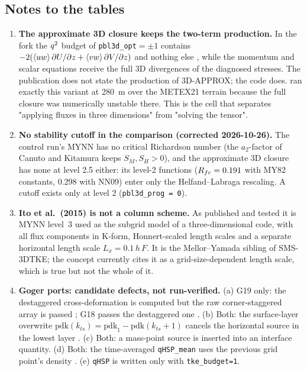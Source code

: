 \subsection*{Notes to the tables}
\begin{small}
\begin{enumerate}[leftmargin=*,itemsep=2pt]
\item \textbf{The approximate 3D closure keeps the two-term production.} In the fork the $q^{2}$
budget of \texttt{pbl3d\_opt}$=\pm1$ contains $-2(\langle uw \rangle\,\partial U/\partial z + \langle vw \rangle\,\partial V/\partial z)$ and
nothing else , while the momentum and scalar equations receive the full 3D
divergences of the diagnosed stresses. The publication does not state the production of 3D-APPROX;
the code does. \textcite{wiersema2023} ran exactly this variant at 280~m over the METEX21 terrain because the full closure was numerically unstable there. This is the cell that separates "applying fluxes in three dimensions" from "solving
the tensor".
\item \textbf{No stability cutoff in the comparison (corrected 2026-10-26).} The control run's MYNN has no critical
Richardson number (the $a_2$-factor of Canuto and Kitamura keeps $S_M, S_H > 0$), and the approximate
3D closure has none at level 2.5 either: its level-2 functions ($R_{fc} = 0.191$ with MY82 constants, 0.298 with
NN09) enter only the Helfand--Labraga rescaling. A cutoff exists only at level 2 (\texttt{pbl3d\_prog = 0}).
\item \textbf{Ito et al.\ (2015) is not a column scheme.} As published and tested it is MYNN
level~3 used as the subgrid model of a three-dimensional code, with all flux components in K-form,
Honnert-scaled length scales and a separate horizontal length scale $L_x = 0.1\,h\,F$. It is the
Mellor--Yamada sibling of SMS-3DTKE; the concept currently cites it as a grid-size-dependent length
scale, which is true but not the whole of it.
\item \textbf{Goger ports: candidate defects, not run-verified.} (a) G19 only: the destaggered
cross-deformation is computed but the raw corner-staggered array is passed ;
G18 passes the destaggered one . (b) Both: the surface-layer overwrite
$\mathrm{pdk}(k_{ts}) = \mathrm{pdk}_1 - \mathrm{pdk}(k_{ts}+1)$ cancels the horizontal source in the
lowest layer . (c) Both: a mass-point source is inserted into an interface quantity.
(d) Both: the time-averaged \texttt{qHSP\_mean} uses the previous grid point's density
. (e) \texttt{qHSP} is written only with \texttt{tke\_budget=1}.

\end{enumerate}
\end{small}
